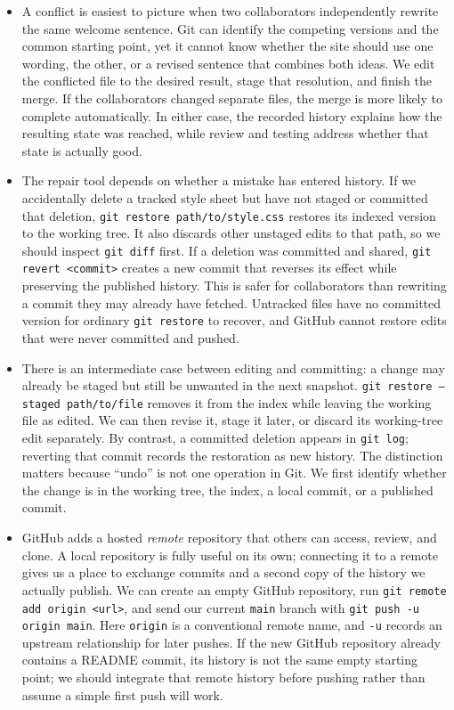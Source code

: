 \documentclass[10pt]{article}
\begin{document}
\begin{itemize}[leftmargin=1.25em, itemsep=0.3em, parsep=0pt, topsep=0pt]
    \item A conflict is easiest to picture when two collaborators independently rewrite the same welcome sentence. Git can identify the competing versions and the common starting point, yet it cannot know whether the site should use one wording, the other, or a revised sentence that combines both ideas. We edit the conflicted file to the desired result, stage that resolution, and finish the merge. If the collaborators changed separate files, the merge is more likely to complete automatically. In either case, the recorded history explains how the resulting state was reached, while review and testing address whether that state is actually good.

    \item The repair tool depends on whether a mistake has entered history. If we accidentally delete a tracked style sheet but have not staged or committed that deletion, \texttt{git restore path/to/style.css} restores its indexed version to the working tree. It also discards other unstaged edits to that path, so we should inspect \texttt{git diff} first. If a deletion was committed and shared, \texttt{git revert <commit>} creates a new commit that reverses its effect while preserving the published history. This is safer for collaborators than rewriting a commit they may already have fetched. Untracked files have no committed version for ordinary \texttt{git restore} to recover, and GitHub cannot restore edits that were never committed and pushed.

    \item There is an intermediate case between editing and committing: a change may already be staged but still be unwanted in the next snapshot. \texttt{git restore --staged path/to/file} removes it from the index while leaving the working file as edited. We can then revise it, stage it later, or discard its working-tree edit separately. By contrast, a committed deletion appears in \texttt{git log}; reverting that commit records the restoration as new history. The distinction matters because ``undo'' is not one operation in Git. We first identify whether the change is in the working tree, the index, a local commit, or a published commit.

    \item GitHub adds a hosted \emph{remote} repository that others can access, review, and clone. A local repository is fully useful on its own; connecting it to a remote gives us a place to exchange commits and a second copy of the history we actually publish. We can create an empty GitHub repository, run \texttt{git remote add origin <url>}, and send our current \texttt{main} branch with \texttt{git push -u origin main}. Here \texttt{origin} is a conventional remote name, and \texttt{-u} records an upstream relationship for later pushes. If the new GitHub repository already contains a README commit, its history is not the same empty starting point; we should integrate that remote history before pushing rather than assume a simple first push will work.


\end{itemize}
\end{document}
